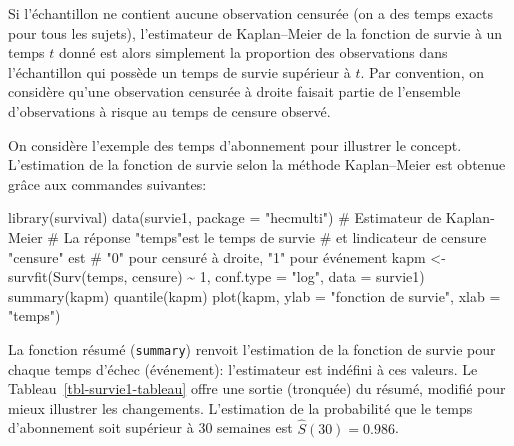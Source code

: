 \documentclass[
  11pt,
  letterpaper,
]{book}
\newenvironment{Shaded}{\begin{snugshade}}{\end{snugshade}}
\newcommand{\AttributeTok}[1]{\textcolor[rgb]{0.40,0.45,0.13}{#1}}
\newcommand{\CommentTok}[1]{\textcolor[rgb]{0.37,0.37,0.37}{#1}}
\newcommand{\DecValTok}[1]{\textcolor[rgb]{0.68,0.00,0.00}{#1}}
\newcommand{\FunctionTok}[1]{\textcolor[rgb]{0.28,0.35,0.67}{#1}}
\newcommand{\NormalTok}[1]{\textcolor[rgb]{0.00,0.23,0.31}{#1}}
\newcommand{\OtherTok}[1]{\textcolor[rgb]{0.00,0.23,0.31}{#1}}
\newcommand{\SpecialCharTok}[1]{\textcolor[rgb]{0.37,0.37,0.37}{#1}}
\newcommand{\StringTok}[1]{\textcolor[rgb]{0.13,0.47,0.30}{#1}}
\theoremstyle{definition}
\theoremstyle{remark}
\begin{document}
Si l'échantillon ne contient aucune observation censurée (on a des temps
exacts pour tous les sujets), l'estimateur de Kaplan--Meier de la
fonction de survie à un temps \(t\) donné est alors simplement la
proportion des observations dans l'échantillon qui possède un temps de
survie supérieur à \(t\). Par convention, on considère qu'une
observation censurée à droite faisait partie de l'ensemble
d'observations à risque au temps de censure observé.

On considère l'exemple des temps d'abonnement pour illustrer le concept.
L'estimation de la fonction de survie selon la méthode Kaplan--Meier est
obtenue grâce aux commandes suivantes:

\begin{Shaded}
\begin{Highlighting}[]
\FunctionTok{library}\NormalTok{(survival)}
\FunctionTok{data}\NormalTok{(survie1, }\AttributeTok{package =} \StringTok{"hecmulti"}\NormalTok{)}
\CommentTok{\# Estimateur de Kaplan{-}Meier}
\CommentTok{\# La réponse "temps"est le temps de survie }
\CommentTok{\# et l\textquotesingle{}indicateur de censure "censure" est}
\CommentTok{\# "0" pour censuré à droite, "1" pour événement}
\NormalTok{kapm }\OtherTok{\textless{}{-}} 
  \FunctionTok{survfit}\NormalTok{(}\FunctionTok{Surv}\NormalTok{(temps, censure) }\SpecialCharTok{\textasciitilde{}} \DecValTok{1}\NormalTok{, }
          \AttributeTok{conf.type =} \StringTok{"log"}\NormalTok{, }
          \AttributeTok{data =}\NormalTok{ survie1)}
\FunctionTok{summary}\NormalTok{(kapm)}
\FunctionTok{quantile}\NormalTok{(kapm)}
\FunctionTok{plot}\NormalTok{(kapm, }
     \AttributeTok{ylab =} \StringTok{"fonction de survie"}\NormalTok{, }
     \AttributeTok{xlab =} \StringTok{"temps"}\NormalTok{) }
\end{Highlighting}
\end{Shaded}

La fonction résumé (\texttt{summary}) renvoit l'estimation de la
fonction de survie pour chaque temps d'échec (événement): l'estimateur
est indéfini à ces valeurs. Le Tableau~\ref{tbl-survie1-tableau} offre
une sortie (tronquée) du résumé, modifié pour mieux illustrer les
changements. L'estimation de la probabilité que le temps d'abonnement
soit supérieur à 30 semaines est \(\widehat{S}(30)=0.986\).
\end{document}
